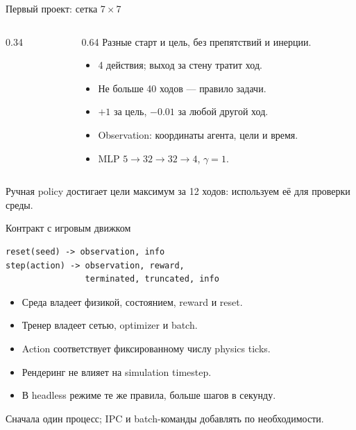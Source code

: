 \documentclass[aspectratio=169]{beamer}
\begin{document}
\begin{frame}{Первый проект: сетка 7\,$\times$\,7}
  \small
  \begin{columns}
    \begin{column}{0.34\textwidth}
      \centering
    \end{column}
    \begin{column}{0.64\textwidth}
      Разные старт и цель, без препятствий и инерции.
      \begin{itemize}
        \item 4 действия; выход за стену тратит ход.
        \item Не больше 40 ходов --- правило задачи.
        \item $+1$ за цель, $-0.01$ за любой другой ход.
        \item Observation: координаты агента, цели и время.
        \item MLP $5\to32\to32\to4$, $\gamma=1$.
      \end{itemize}
    \end{column}
  \end{columns}
  \vspace{0.2cm}
  Ручная policy достигает цели максимум за 12 ходов:
  используем её для проверки среды.
\end{frame}

\begin{frame}[fragile]{Контракт с игровым движком}
\begin{verbatim}
reset(seed) -> observation, info
step(action) -> observation, reward,
                terminated, truncated, info
\end{verbatim}
  \begin{itemize}
    \item Среда владеет физикой, состоянием, reward и reset.
    \item Тренер владеет сетью, optimizer и batch.
    \item Action соответствует фиксированному числу physics ticks.
    \item Рендеринг не влияет на simulation timestep.
    \item В headless режиме те же правила, больше шагов в секунду.
  \end{itemize}
  Сначала один процесс; IPC и batch-команды добавлять по необходимости.
\end{frame}
\end{document}

